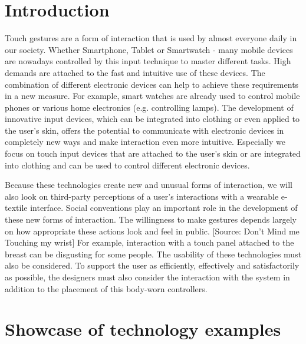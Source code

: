 \documentclass{sigchi}
\begin{document}
\section{Introduction}
%

Touch gestures are a form of interaction that is used by almost everyone daily in our society. Whether Smartphone, Tablet or Smartwatch - many mobile devices are nowadays controlled by this input technique to master different tasks. High demands are attached to the fast and intuitive use of these devices. The combination of different electronic devices can help to achieve these requirements in a new measure. For example, smart watches are already used to control mobile phones or various home electronics (e.g. controlling lamps). The development of innovative input devices, which can be integrated into clothing or even applied to the user's skin, offers the potential to communicate with electronic devices in completely new ways and make interaction even more intuitive. Especially we focus on touch input devices that are attached to the user's skin or are integrated into clothing and can be used to control different electronic devices.

Because these technologies create new and unusual forms of interaction, we will also look on third-party perceptions of a user’s interactions with a wearable e-textile interface. Social conventions play an important role in the development of these new forms of interaction. The willingness to make gestures depends largely on how appropriate these actions look and feel in public. [Source: Don’t Mind me Touching my wrist] For example, interaction with a touch panel attached to the breast can be disgusting for some people. The usability of these technologies must also be considered. To support the user as efficiently, effectively and satisfactorily as possible, the designers must also consider the interaction with the system in addition to the placement of this body-worn controllers.



\section{Showcase of technology examples}
%
\end{document}
